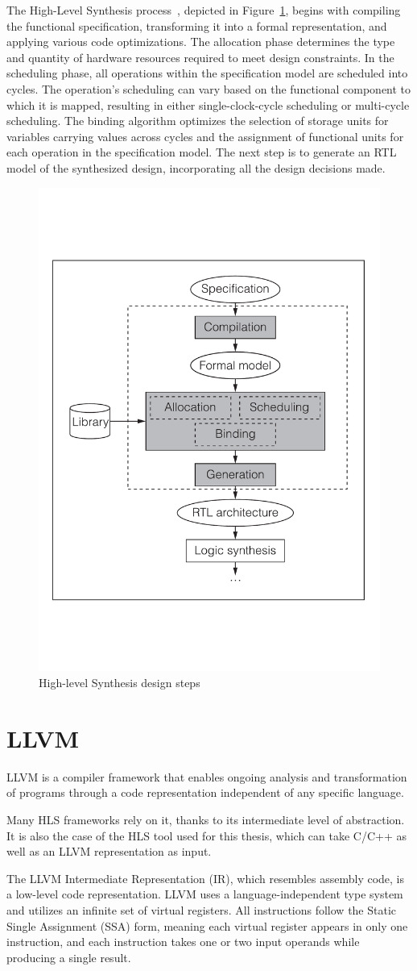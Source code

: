 The High-Level Synthesis process~\cite{5209958}, depicted in Figure~\ref{fig:hls}, begins with compiling the functional specification, transforming it into a formal representation, and applying various code optimizations.
The allocation phase determines the type and quantity of hardware resources required to meet design constraints.
In the scheduling phase, all operations within the specification model are scheduled into cycles.
The operation's scheduling can vary based on the functional component to which it is mapped, resulting in either single-clock-cycle scheduling or multi-cycle scheduling.
The binding algorithm optimizes the selection of storage units for variables carrying values across cycles and the assignment of functional units for each operation in the specification model.
The next step is to generate an RTL model of the synthesized design, incorporating all the design decisions made.

\begin{figure}[t]
    \centering
    \includegraphics[height=0.4\textwidth]{Images/hls}
    \caption{High-level Synthesis design steps~\cite{5209958}}
    \label{fig:hls}
\end{figure}

\section{LLVM}
\label{sec:llvm}%

LLVM is a compiler framework that enables ongoing analysis and transformation of programs through a code representation independent of any specific language.

Many HLS frameworks rely on it, thanks to its intermediate level of abstraction.
It is also the case of the HLS tool used for this thesis, which can take C/C++ as well as an LLVM representation as input.

The LLVM Intermediate Representation (IR), which resembles assembly code, is a low-level code representation.
LLVM uses a language-independent type system and utilizes an infinite set of virtual registers.
All instructions follow the Static Single Assignment (SSA) form, meaning each virtual register appears in only one instruction, and each instruction takes one or two input operands while producing a single result.


